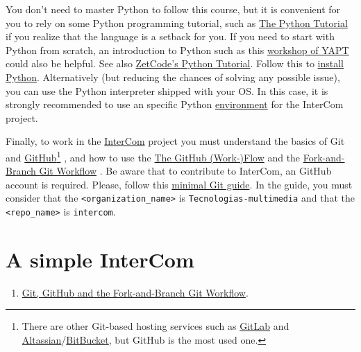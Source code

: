 You don't need to master Python to follow this course, but it is
convenient for you to rely on some Python programming tutorial, such
as \href{https://docs.python.org/3/tutorial/}{The Python Tutorial}
\cite{python-tutorial} if you realize that the language is a setback
for you. If you need to start with Python from scratch, an
introduction to Python such as this
\href{https://github.com/vicente-gonzalez-ruiz/YAPT/tree/master/workshops/programacion_python_ESO}{workshop
  of YAPT} \cite{YAPT} could also be helpful. See also
\href{http://zetcode.com/lang/python/}{ZetCode's Python
  Tutorial}. Follow this to
\href{https://vicente-gonzalez-ruiz.github.io/Python_install/}{install
  Python}. Alternatively (but reducing the chances of solving any
possible issue), you can use the Python interpreter shipped with your
OS. In this case, it is strongly recommended to use an specific Python
\href{https://docs.python.org/3/library/venv.html}{environment} for
the InterCom project.

Finally, to work in the
\href{https://github.com/Tecnologias-multimedia/intercom}{InterCom}
project \cite{intercom} you must understand the basics of Git
\cite{Git-book} and \href{https://github.com/}{GitHub}\footnote{There
are other Git-based hosting services such as
\href{https://about.gitlab.com/}{GitLab} and
\href{https://www.atlassian.com/git}{Altassian}/\href{https://bitbucket.org/product}{BitBucket},
but GitHub is the most used one.} \cite{GitHub}, and how to use the
\href{https://guides.github.com/introduction/flow/index.html}{The
  GitHub (Work-)Flow} and the
\href{https://github.com/vicente-gonzalez-ruiz/fork_and_branch_git_workflow}{Fork-and-Branch
  Git Workflow} \cite{fork-and-branch-git-workflow}. Be aware that to
contribute to InterCom, an GitHub account is required. Please, follow
this
\href{https://vicente-gonzalez-ruiz.github.io/using_GitHub/}{minimal
  Git guide}. In the guide, you must consider that the
\texttt{<organization\_name>} is \texttt{Tecnologias-multimedia} and
that the \texttt{<repo\_name>} is \texttt{intercom}.


\section{A simple InterCom}

\begin{enumerate}
\item \href{https://tecnologias-multimedia.github.io/study_guide/03-git/}{Git, GitHub and the Fork-and-Branch Git Workflow}.
\end{enumerate}

